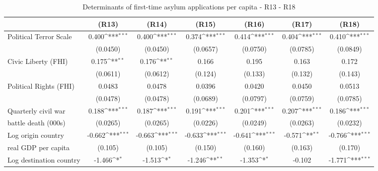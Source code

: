 \begin{table}[htbp]\centering \scriptsize
\def\sym#1{\ifmmode^{#1}\else\(^{#1}\)\fi}
\caption{Determinants of first-time asylum applications per capita - R13 - R18}
\begin{tabular}{l*{6}{c}}
\hline\hline
                    &\multicolumn{1}{c}{(R13)}         &\multicolumn{1}{c}{(R14)}         &\multicolumn{1}{c}{(R15)}         &\multicolumn{1}{c}{(R16)}         &\multicolumn{1}{c}{(R17)}         &\multicolumn{1}{c}{(R18)}         \\
\hline
Political Terror Scale&       0.400\sym{***}&       0.400\sym{***}&       0.374\sym{***}&       0.414\sym{***}&       0.404\sym{***}&       0.410\sym{***}\\
                    &    (0.0450)         &    (0.0450)         &    (0.0657)         &    (0.0750)         &    (0.0785)         &    (0.0849)         \\
[0.5em]
Civic Liberty (FHI) &       0.175\sym{**} &       0.176\sym{**} &       0.166         &       0.195         &       0.163         &       0.172         \\
                    &    (0.0611)         &    (0.0612)         &     (0.124)         &     (0.133)         &     (0.132)         &     (0.143)         \\
[0.5em]
Political Rights (FHI)&      0.0483         &      0.0478         &      0.0396         &      0.0420         &      0.0450         &      0.0513         \\
                    &    (0.0478)         &    (0.0478)         &    (0.0689)         &    (0.0797)         &    (0.0759)         &    (0.0785)         \\
[0.5em]
Quarterly civil war&       0.188\sym{***}&       0.187\sym{***}&       0.191\sym{***}&       0.201\sym{***}&       0.207\sym{***}&       0.186\sym{***}\\
 battle death (000s)                    &    (0.0265)         &    (0.0265)         &    (0.0226)         &    (0.0249)         &    (0.0263)         &    (0.0232)         \\
[0.5em]
Log origin country &      -0.662\sym{***}&      -0.663\sym{***}&      -0.633\sym{***}&      -0.641\sym{***}&      -0.571\sym{**} &      -0.766\sym{***}\\
real GDP per capita                   &     (0.105)         &     (0.105)         &     (0.150)         &     (0.160)         &     (0.163)         &     (0.170)         \\
[0.5em]
Log destination country &      -1.466\sym{*}  &      -1.513\sym{*}  &      -1.246\sym{**} &      -1.353\sym{*}  &      -0.102         &      -1.771\sym{***}\\

\end{tabular}
\end{table}

